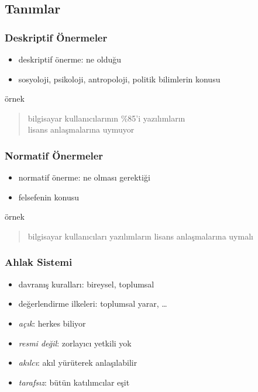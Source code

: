 \documentclass[dvipsnames]{beamer}
\theoremstyle{plain}
\begin{document}
\subsection{Tanımlar}

\begin{frame}
  \frametitle{Deskriptif Önermeler}

  \begin{itemize}
    \item \alert{deskriptif} önerme: ne olduğu
    \item sosyoloji, psikoloji, antropoloji, politik bilimlerin konusu
  \end{itemize}

  \pause
  \begin{exampleblock}{örnek}
    \begin{quote}
      bilgisayar kullanıcılarının \%85'i yazılımların\\
      lisans anlaşmalarına uymuyor
    \end{quote}
  \end{exampleblock}
\end{frame}

\begin{frame}
  \frametitle{Normatif Önermeler}

  \begin{itemize}
    \item \alert{normatif} önerme: ne olması gerektiği
    \item felsefenin konusu
  \end{itemize}

  \pause
  \begin{exampleblock}{örnek}
    \begin{quote}
      bilgisayar kullanıcıları yazılımların lisans anlaşmalarına uymalı
    \end{quote}
  \end{exampleblock}
\end{frame}

\begin{frame}
  \frametitle{Ahlak Sistemi}

  \begin{itemize}
    \item davranış kuralları: bireysel, toplumsal
    \item değerlendirme ilkeleri: toplumsal yarar, \ldots

    \pause
    \bigskip
    \item \emph{açık}: herkes biliyor
    \item \emph{resmi değil}: zorlayıcı yetkili yok
    \item \emph{akılcı}: akıl yürüterek anlaşılabilir
    \item \emph{tarafsız}: bütün katılımcılar eşit
  \end{itemize}
\end{frame}
\end{document}
